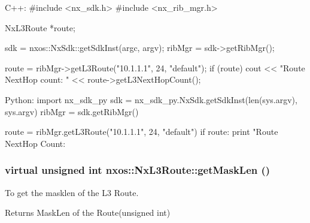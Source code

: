 \begin{DoxyCode}
  C++:
       #include <nx_sdk.h>
       #include <nx_rib_mgr.h>

       NxL3Route    *route;

       sdk = nxos::NxSdk::getSdkInst(argc, argv);
       ribMgr = sdk->getRibMgr();

       route = ribMgr->getL3Route("10.1.1.1", 24, "default");
       if (route) {
           cout << "Route NextHop count: " << route->getL3NextHopCount();
       }

  Python:
       import nx_sdk_py
       sdk = nx_sdk_py.NxSdk.getSdkInst(len(sys.argv), sys.argv)
       ribMgr = sdk.getRibMgr()

       route = ribMgr.getL3Route("10.1.1.1", 24, "default")
       if route:
          print "Route NextHop Count: %
\end{DoxyCode}
 \hypertarget{classnxos_1_1NxL3Route_aaafa1d34e62297bbed574995ff48dba9}{
\subsubsection[{getMaskLen}]{\setlength{\rightskip}{0pt plus 5cm}virtual unsigned int nxos::NxL3Route::getMaskLen ()}}
\label{classnxos_1_1NxL3Route_aaafa1d34e62297bbed574995ff48dba9}
To get the masklen of the L3 Route.

\begin{DoxyReturn}{Returns}
MaskLen of the Route(unsigned int)
\end{DoxyReturn}

